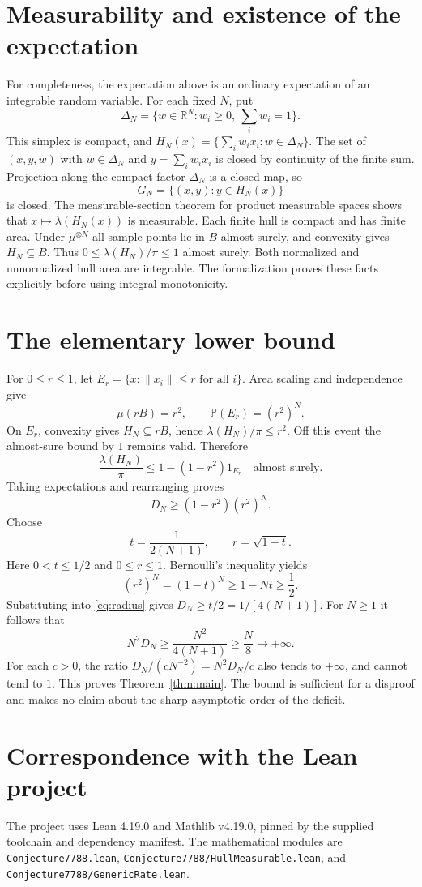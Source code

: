 \documentclass[11pt]{article}
\newcommand{\R}{\mathbb R}
\newcommand{\Pp}{\mathbb P}
\begin{document}
\section{Measurability and existence of the expectation}
For completeness, the expectation above is an ordinary expectation of
an integrable random variable. For each fixed $N$, put
\[
 \Delta_N=\{w\in\R^N:w_i\geq0,\ \textstyle\sum_iw_i=1\}.
\]
This simplex is compact, and
$H_N(x)=\{\sum_iw_ix_i:w\in\Delta_N\}$.
The set of $(x,y,w)$ with $w\in\Delta_N$ and
$y=\sum_iw_ix_i$ is closed by continuity of the finite sum.
Projection along the compact factor $\Delta_N$ is a closed map, so
\[
 G_N=\{(x,y):y\in H_N(x)\}
\]
is closed. The measurable-section theorem for product measurable
spaces shows that $x\mapsto\lambda(H_N(x))$ is measurable.
Each finite hull is compact and has finite area. Under
$\mu^{\otimes N}$ all sample points lie in $B$ almost surely, and
convexity gives $H_N\subseteq B$. Thus
$0\leq\lambda(H_N)/\pi\leq1$ almost surely. Both normalized and
unnormalized hull area are integrable. The formalization proves these
facts explicitly before using integral monotonicity.

\section{The elementary lower bound}
For $0\leq r\leq1$, let
$E_r=\{x:\lVert x_i\rVert\leq r\text{ for all }i\}$.
Area scaling and independence give
\[
 \mu(rB)=r^2,\qquad \Pp(E_r)=(r^2)^N.
\]
On $E_r$, convexity gives $H_N\subseteq rB$, hence
$\lambda(H_N)/\pi\leq r^2$. Off this event the almost-sure bound by
$1$ remains valid. Therefore
\[
 \frac{\lambda(H_N)}{\pi}
 \leq1-(1-r^2)1_{E_r}
 \quad\text{almost surely}.
\]
Taking expectations and rearranging proves
\begin{equation}\label{eq:radius}
 D_N\geq(1-r^2)(r^2)^N.
\end{equation}
Choose
\[
 t=\frac{1}{2(N+1)},\qquad r=\sqrt{1-t}.
\]
Here $0<t\leq1/2$ and $0\leq r\leq1$. Bernoulli's inequality yields
\[
 (r^2)^N=(1-t)^N\geq1-Nt\geq\frac12.
\]
Substituting into \eqref{eq:radius} gives
$D_N\geq t/2=1/[4(N+1)]$.
For $N\geq1$ it follows that
\[
 N^2D_N\geq\frac{N^2}{4(N+1)}\geq\frac N8\longrightarrow+\infty.
\]
For each $c>0$, the ratio $D_N/(cN^{-2})=N^2D_N/c$ also tends to
$+\infty$, and cannot tend to $1$. This proves
Theorem~\ref{thm:main}. The bound is sufficient for a disproof and makes
no claim about the sharp asymptotic order of the deficit.

\newpage
\section{Correspondence with the Lean project}
The project uses Lean 4.19.0 and Mathlib v4.19.0, pinned by the supplied
toolchain and dependency manifest. The mathematical modules are
\nolinkurl{Conjecture7788.lean},
\nolinkurl{Conjecture7788/HullMeasurable.lean}, and
\nolinkurl{Conjecture7788/GenericRate.lean}.
\end{document}

